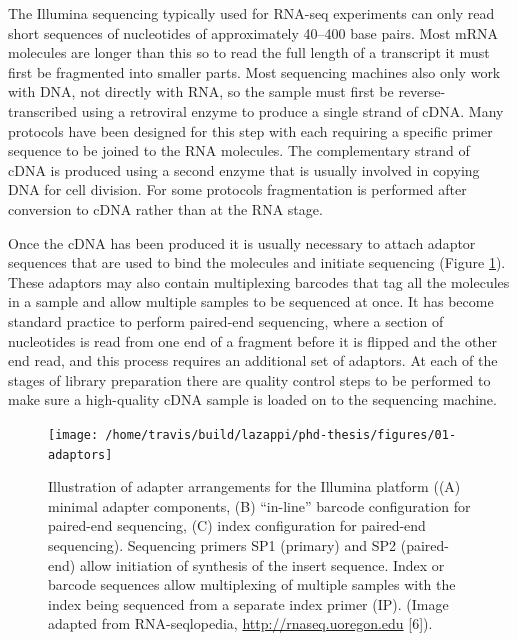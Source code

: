 \documentclass[11pt,a4paper,titlepage,twoside,openright]{style/unimelbthesis}
\theoremstyle{definition}
\theoremstyle{definition}
\theoremstyle{definition}
\theoremstyle{remark}
\begin{document}
\begin{mainmatter}
The Illumina sequencing typically used for RNA-seq experiments can only read short sequences of nucleotides of approximately 40--400 base pairs. Most mRNA molecules are longer than this so to read the full length of a transcript it must first be fragmented into smaller parts. Most sequencing machines also only work with DNA, not directly with RNA, so the sample must first be reverse-transcribed using a retroviral enzyme to produce a single strand of cDNA. Many protocols have been designed for this step with each requiring a specific primer sequence to be joined to the RNA molecules. The complementary strand of cDNA is produced using a second enzyme that is usually involved in copying DNA for cell division. For some protocols fragmentation is performed after conversion to cDNA rather than at the RNA stage.

Once the cDNA has been produced it is usually necessary to attach adaptor sequences that are used to bind the molecules and initiate sequencing (Figure \ref{fig:adaptors}). These adaptors may also contain multiplexing barcodes that tag all the molecules in a sample and allow multiple samples to be sequenced at once. It has become standard practice to perform paired-end sequencing, where a section of nucleotides is read from one end of a fragment before it is flipped and the other end read, and this process requires an additional set of adaptors. At each of the stages of library preparation there are quality control steps to be performed to make sure a high-quality cDNA sample is loaded on to the sequencing machine.

\begin{figure}

{\centering \texttt{[image: /home/travis/build/lazappi/phd-thesis/figures/01-adaptors]} 

}

\caption[Illustration of adapter arrangements for the Illumina platform.]{Illustration of adapter arrangements for the Illumina platform ((A) minimal adapter components, (B) \enquote{in-line} barcode configuration for paired-end sequencing, (C) index configuration for paired-end sequencing). Sequencing primers SP1 (primary) and SP2 (paired-end) allow initiation of synthesis of the insert sequence. Index or barcode sequences allow multiplexing of multiple samples with the index being sequenced from a separate index primer (IP). (Image adapted from RNA-seqlopedia, \url{http://rnaseq.uoregon.edu} {[}6{]}).}\label{fig:adaptors}
\end{figure}






\end{mainmatter}
\end{document}
